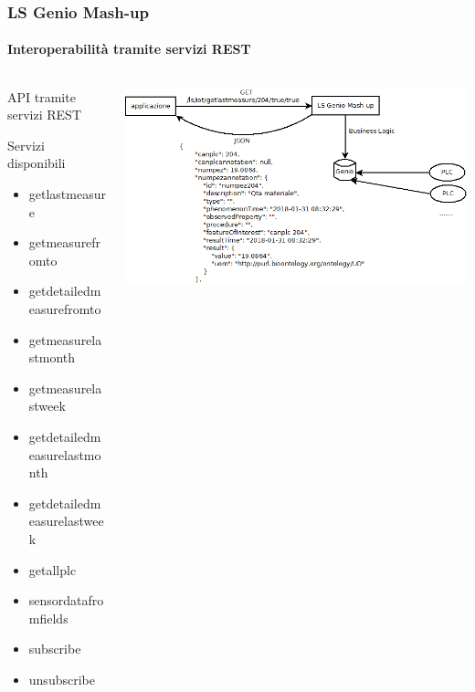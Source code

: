 \documentclass{beamer}
\begin{document}
\begin{frame}
	\frametitle{LS Genio Mash-up}
	\framesubtitle{Interoperabilità tramite servizi REST}
	\begin{columns}[T] %
		\begin{column}{.4\textwidth}
			\begin{itemize}
				{\tiny
					\item API tramite servizi REST
					\item Servizi disponibili
					\begin{itemize}
						\tiny
						\item getlastmeasure
						\item getmeasurefromto
						\item getdetailedmeasurefromto
						\item getmeasurelastmonth
						\item getmeasurelastweek
						\item getdetailedmeasurelastmonth
						\item getdetailedmeasurelastweek
						\item getallplc
						\item sensordatafromfields
						\item subscribe
						\item unsubscribe
					\end{itemize}
				}
			\end{itemize}
			
		\end{column}%
		\hfill%
		\begin{column}{.56\textwidth}
			\includegraphics[width=1\textwidth]{images/interoperabilita-rest.png}
		\end{column}%
	\end{columns}
\end{frame}
\end{document}
